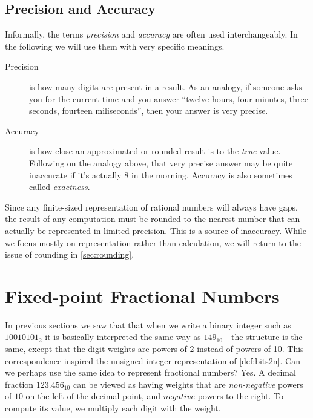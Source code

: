 \subsection{Precision and Accuracy}

Informally, the terms \emph{precision} and \emph{accuracy} are often
used interchangeably.  In the following we will use them with very
specific meanings.

\begin{description}
\item[Precision] is how many digits are present in a result.  As an
  analogy, if someone asks you for the current time and you answer
  ``twelve hours, four minutes, three seconds, fourteen miliseconds'',
  then your answer is very precise.
\item[Accuracy] is how close an approximated or rounded result is to
  the \emph{true} value.  Following on the analogy above, that very
  precise answer may be quite inaccurate if it's actually 8 in the
  morning.  Accuracy is also sometimes called \emph{exactness}.
\end{description}

Since any finite-sized representation of rational numbers will always
have gaps, the result of any computation must be rounded to the
nearest number that can actually be represented in limited precision.
This is a source of inaccuracy.  While we focus mostly on
representation rather than calculation, we will return to the issue of
rounding in \cref{sec:rounding}.

\section{Fixed-point Fractional Numbers}

In previous sections we saw that that when we write a binary integer
such as $10010101_{2}$ it is basically interpreted the same way as
$149_{10}$---the structure is the same, except that the digit weights
are powers of 2 instead of powers of 10.  This correspondence inspired
the unsigned integer representation of \cref{def:bits2n}.  Can we
perhaps use the same idea to represent fractional numbers?  Yes.  A
decimal fraction $123.456_{10}$ can be viewed as having weights that
are \emph{non-negative} powers of $10$ on the left of the decimal
point, and $negative$ powers to the right.  To compute its value, we
multiply each digit with the weight.

